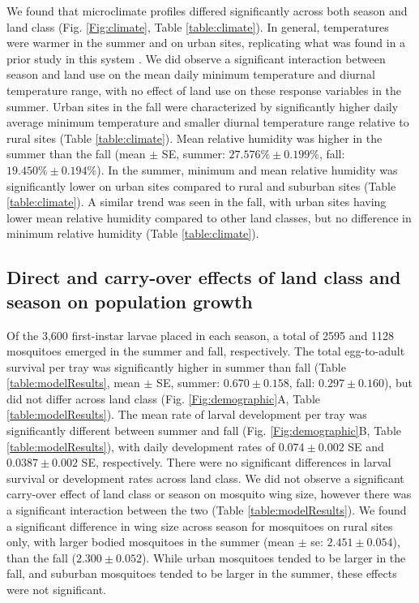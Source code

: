 \documentclass[12pt]{article}
\begin{document}
We found that microclimate profiles differed significantly across both season and land class (Fig. \ref{Fig:climate}, Table \ref{table:climate}).
In general, temperatures were warmer in the summer and on urban sites, replicating what was found in a prior study in this system \cite{murdock2017}.
We did observe a significant interaction between season and land use on the mean daily minimum temperature and diurnal temperature range, with no effect of land use on these response variables in the summer.
Urban sites in the fall were characterized by significantly higher daily average minimum temperature and smaller diurnal temperature range relative to rural sites (Table \ref{table:climate}).
Mean relative humidity was higher in the summer than the fall (mean $\pm$ SE, summer: $27.576\% \pm 0.199\%$, fall: $19.450\% \pm 0.194\%$).
In the summer, minimum and mean relative humidity was significantly lower on urban sites compared to rural and suburban sites (Table \ref{table:climate}).
A similar trend was seen in the fall, with urban sites having lower mean relative humidity compared to other land classes, but no difference in minimum relative humidity (Table \ref{table:climate}).

\subsection*{Direct and carry-over effects of land class and season on population growth}

Of the 3,600 first-instar larvae placed in each season, a total of 2595 and 1128 mosquitoes emerged in the summer and fall, respectively.
The total egg-to-adult survival per tray was significantly higher in summer than fall (Table \ref{table:modelResults}, mean $\pm$ SE, summer: $0.670 \pm 0.158$, fall: $0.297 \pm 0.160$), but did not differ across land class (Fig. \ref{Fig:demographic}A, Table \ref{table:modelResults}).
The mean rate of larval development per tray was significantly different between summer and fall (Fig. \ref{Fig:demographic}B, Table \ref{table:modelResults}), with daily development rates of $0.074 \pm 0.002$ SE and $0.0387 \pm 0.002$ SE, respectively.
There were no significant differences in larval survival or development rates across land class.
We did not observe a significant carry-over effect of land class or season on mosquito wing size, however there was a significant interaction between the two (Table \ref{table:modelResults}).
We found a significant difference in wing size across season for mosquitoes on rural sites only, with larger bodied mosquitoes in the summer (mean $\pm$ se: $2.451 \pm 0.054$), than the fall ($2.300 \pm 0.052$).
While urban mosquitoes tended to be larger in the fall, and suburban mosquitoes tended to be larger in the summer, these effects were not significant.
\end{document}

